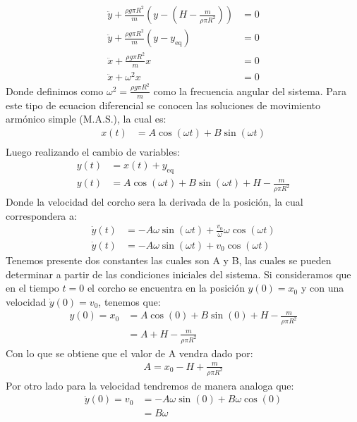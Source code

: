 \documentclass[
  11pt,
  letterpaper,
   addpoints,
   answers
  ]{exam}
\begin{document}
\begin{questions}
\begin{solution}
\begin{align}
    \ddot{y} + \frac{\rho g \pi R^2}{m} \left( y - \left( H - \frac{m}{\rho \pi R^2} \right) \right) &= 0\\
    \ddot{y} + \frac{\rho g \pi R^2}{m} \left( y - y_{\mathrm{eq}}\right) &= 0\\
    \ddot{x} + \frac{\rho g \pi R^2}{m} x &= 0\\
    \ddot{x} + \omega^2 x &= 0
\end{align}
Donde definimos como $\omega^2 = \frac{\rho g \pi R^2}{m}$ como la frecuencia angular del sistema. Para este tipo de ecuacion diferencial se conocen las soluciones de movimiento armónico simple (M.A.S.), la cual es:
\begin{align}
    x(t) &= A \cos(\omega t) + B \sin(\omega t)\\
\end{align}
Luego realizando el cambio de variables:
\begin{align}
    y(t) &= x(t) + y_{\mathrm{eq}}\\
    y(t) &= A \cos(\omega t) + B \sin(\omega t) + H - \frac{m}{\rho \pi R^2}
\end{align}
Donde la velocidad del corcho sera la derivada de la posición, la cual correspondera a:
\begin{align}
    \dot{y}(t) &= -A \omega \sin(\omega t) + \frac{v_0}{\omega} \omega \cos(\omega t)\\
    \dot{y}(t) &= -A \omega \sin(\omega t) + v_0 \cos(\omega t)
\end{align}
Tenemos presente dos constantes las cuales son A y B, las cuales se pueden determinar a partir de las condiciones iniciales del sistema. Si consideramos que en el tiempo $t=0$ el corcho se encuentra en la posición $y(0) = x_0$ y con una velocidad $\dot{y}(0) = v_0$, tenemos que:
\begin{align}
    y(0) = x_{0} &=  A\cos(0)+B\sin(0) + H - \frac{m}{\rho \pi R^2}\\
    &= A + H - \frac{m}{\rho \pi R^2} 
\end{align}
Con lo que se obtiene que el  valor de A vendra dado por:
\begin{align}
    A= x_0 - H + \frac{m}{\rho \pi R^2}
\end{align}
Por otro lado para la velocidad tendremos de manera analoga que:
\begin{align}
    \dot{y}(0) = v_{0} &= -A \omega \sin(0) + B \omega \cos(0) \\
    &= B \omega
\end{align}

\end{solution}
\end{questions}
\end{document}

